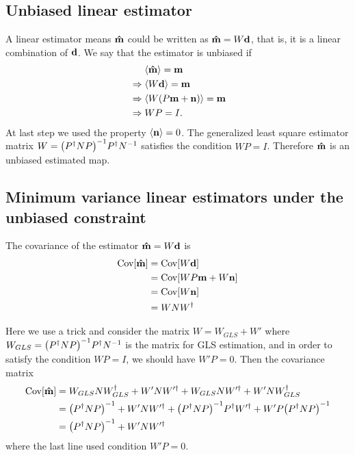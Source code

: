 \documentclass[11pt, letterpaper]{article}
\newcommand{\Cov}[1]{\text{Cov}\qty[#1]}
\newcommand{\vbd}{\vb{d}}
\newcommand{\vbm}{\vb{m}}
\newcommand{\vbn}{\vb{n}}
\newcommand{\inv}[1]{#1^{-1}}
\newcommand{\hatm}{\vb{\hat{m}}}
\newcommand{\Pdagger}{P^{\dagger}}
\newcommand{\PPinv}[1]{\inv{\qty(\Pdagger #1 P)}}
\begin{document}
\subsection{Unbiased linear estimator}
A linear estimator means $\hatm$ could be written as $\hatm = W\vbd$, that is, 
it is a linear combination of $\vbd$.
We say that the estimator is unbiased if
\begin{align}
\begin{aligned}[b]
&\mathrel{\phantom{\Rightarrow}}\ev{\hatm} = \vbm \\
&\Rightarrow\ev{W \vbd} = \vbm\\
&\Rightarrow\ev{W(P\vbm + \vbn) } = \vbm \\
&\Rightarrow WP = I.
\end{aligned}
\end{align}
At last step we used the property  $\ev{\vbn} = 0$.
The generalized least square estimator matrix 
$W = \PPinv{N} \Pdagger \inv{N}  $ satisfies the condition $WP=I$.
Therefore $\hatm$ is an unbiased estimated map.


\subsection{Minimum variance linear estimators under the unbiased constraint} \label{minimize variance}
The covariance of the estimator $\hatm = W \vbd$ is
\begin{align}
\begin{aligned}[b]
\Cov{\hatm} &= \Cov{W\vbd} 
\\ 
&= \Cov{WP\vbm + W\vbn} 
\\ 
&= \Cov{W\vbn} 
\\ 
&= W N W^{\dagger} \label{covariance hatm}
\end{aligned}
\end{align}

Here we use a trick \cite{weighted_and_GLS} and consider the matrix $W = W_{GLS} + W'$ where
$W_{GLS} = \PPinv{N} \Pdagger \inv{N} $ is the matrix for GLS estimation,
and in order to satisfy the condition $WP = I$, we should have $W'P = 0$.
Then the covariance matrix
\begin{align}
\begin{aligned}[b]
\Cov{\hatm }
&= W_{GLS} N W_{GLS}^{\dagger} + W' N W'^{\dagger} 
    + W_{GLS} N W'^{\dagger} + W' N W_{GLS}^{\dagger}
\\
&= \PPinv{N} + W' N W'^{\dagger} 
    + \PPinv{N} \Pdagger W'^{\dagger} + W' P \PPinv{N}
\\
&= \PPinv{N} + W' N W'^{\dagger} 
\end{aligned}
\end{align}
where the last line used condition $W'  P = 0$.
\end{document}
